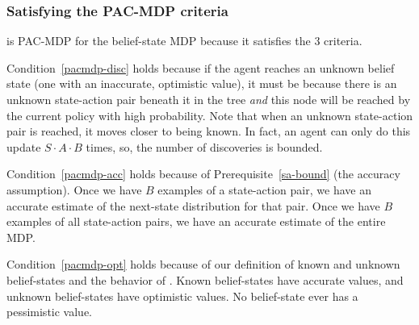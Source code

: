 \subsubsection{Satisfying the PAC-MDP criteria}

 is PAC-MDP for the belief-state MDP because it satisfies the 3 criteria.

Condition~\ref{pacmdp-disc} holds because if the agent reaches an unknown belief state (one with an inaccurate, optimistic value), it must be because there is an unknown state-action pair beneath it in the tree \emph{and} this node will be reached by the current policy with high probability.
 Note that when an unknown state-action pair is reached, it moves closer to being known.  In fact, an agent can only do this update $S\cdot A \cdot B$ times, so, the number of discoveries is bounded.


Condition~\ref{pacmdp-acc} holds because of Prerequisite~\ref{sa-bound} (the accuracy assumption). Once we have $B$ examples of a state-action pair, we have an accurate estimate of the next-state distribution for that pair. Once we have $B$ examples of all state-action pairs, we have an accurate estimate of the entire MDP.


Condition~\ref{pacmdp-opt} holds because of our definition of known and unknown belief-states and the behavior of . Known belief-states have accurate values, and unknown belief-states have optimistic values. No belief-state ever has a pessimistic value.

